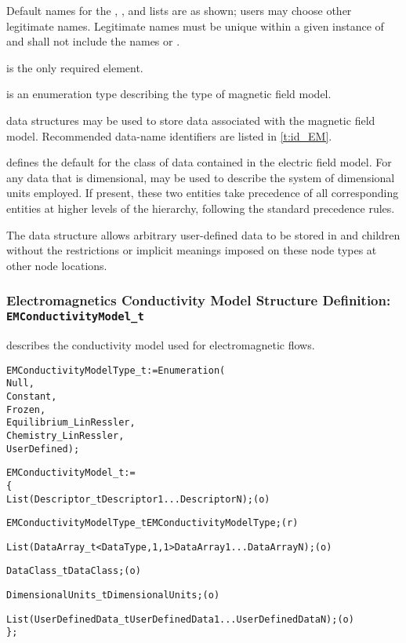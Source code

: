 \begin{notes}
\item Default names for the , , and
      lists are as shown; users may choose other legitimate names.
      Legitimate names must be unique within a given instance of
       and shall not include the names
       or .
\item {} is the only required element.
\end{notes}

 is an enumeration type describing
the type of magnetic field model.

 data structures may be used to store data associated
with the magnetic field model.
Recommended data-name identifiers are listed in \autoref{t:id_EM}.

 defines the default for the class of data contained in
the electric field model.
For any data that is dimensional,  may be used to
describe the system of dimensional units employed.
If present, these two entities take precedence of all corresponding
entities at higher levels of the hierarchy, following the standard
precedence rules.

The  data structure allows arbitrary
user-defined data to be stored in  and
 children without the restrictions or implicit
meanings imposed on these node types at other node locations.

\subsubsection{Electromagnetics Conductivity Model Structure Definition: \texttt{EMConductivityModel\_t}}

 describes the conductivity model used
for electromagnetic flows.
\begin{alltt}
  EMConductivityModelType\_t := Enumeration(
    Null,
    Constant,
    Frozen,
    Equilibrium\_LinRessler,
    Chemistry\_LinRessler,
    UserDefined ) ;
\end{alltt}

\begin{alltt}
  EMConductivityModel\_t :=
    \{
    List( Descriptor\_t Descriptor1 ... DescriptorN ) ;                      (o)

    EMConductivityModelType\_t EMConductivityModelType ;                     (r)
    
    List( DataArray\_t<DataType, 1, 1> DataArray1 ... DataArrayN ) ;         (o)

    DataClass\_t DataClass ;                                                 (o)
                
    DimensionalUnits\_t DimensionalUnits ;                                   (o)

    List( UserDefinedData\_t UserDefinedData1 ... UserDefinedDataN ) ;       (o)
    \} ;
\end{alltt}

